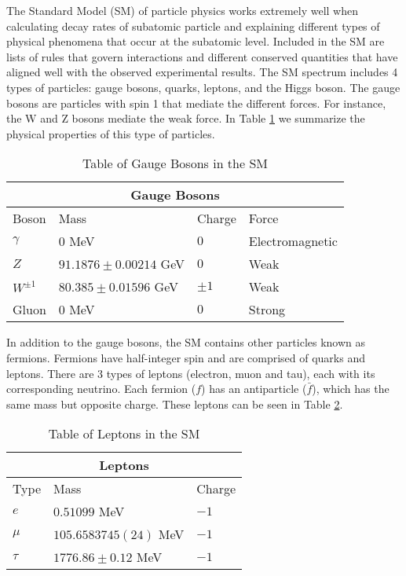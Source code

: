 \documentclass[12pt]{article}
\def \[{\left[}
\def \ga{\gamma}
\begin{document}
The Standard Model (SM) of particle physics works extremely well when calculating decay rates of subatomic particle and explaining different types of physical phenomena that occur at the subatomic level. Included in the SM are lists of rules that govern interactions and different conserved quantities that have aligned well with the observed experimental results. The SM spectrum includes 4 types of particles: gauge bosons, quarks, leptons, and the Higgs boson. The gauge bosons are particles with spin 1 that mediate the different forces. For instance, the W and Z bosons mediate the weak force. In Table \ref{table:1} we summarize the physical properties of this type of particles. 
%
\begin{table}[htbp!]
\centering
\begin{tabular}{ |p{2cm}||p{5cm}|p{1.5cm}|p{3cm}|  }
 \hline
 \multicolumn{4}{|c|}{Gauge Bosons} \\
 \hline
 Boson & Mass & Charge & Force\\
 \hline
 $\ga$ & $0$ MeV & $0$ & Electromagnetic\\ [1ex]
 $Z$ &  $91.1876\pm 0.00214$ GeV & $0$ & Weak\\ [1ex]
 $W^{\pm 1}$ &$80.385 \pm 0.01596$ GeV & $\pm 1$ & Weak\\[1ex]
 Gluon & $0$ MeV &$0$ & Strong \\[1ex]
 \hline 
\end{tabular}
\caption{Table of Gauge Bosons in the SM \cite{Agashe:2014kda}}
\label{table:1}
\end{table}

In addition to the gauge bosons, the SM contains other particles known as fermions. Fermions have half-integer spin and are comprised of quarks and leptons. There are 3 types of leptons (electron, muon and tau), each with its corresponding neutrino. Each fermion ($f$) has an antiparticle ($\bar f$), which has the same mass but opposite charge. These leptons can be seen in Table \ref{table:2}.
\begin{table}[htbp!]
\centering
\begin{tabular}{ |p{1cm}||p{4cm}|p{1.5cm}| }
 \hline
 \multicolumn{3}{|c|}{Leptons} \\
 \hline
 Type & Mass & Charge\\
 \hline
 $e$ & $0.51099$ MeV & $-1$ \\ [1ex]
 $\mu$ &  $105.6583745(24)$ MeV & $-1$ \\ [1ex]
 $\tau$ &$1776.86\pm 0.12$ MeV & $-1$ \\[1ex]
 \hline 
\end{tabular}
\caption{Table of Leptons in the SM \cite{Agashe:2014kda}}
\label{table:2}
\end{table}
\end{document}
